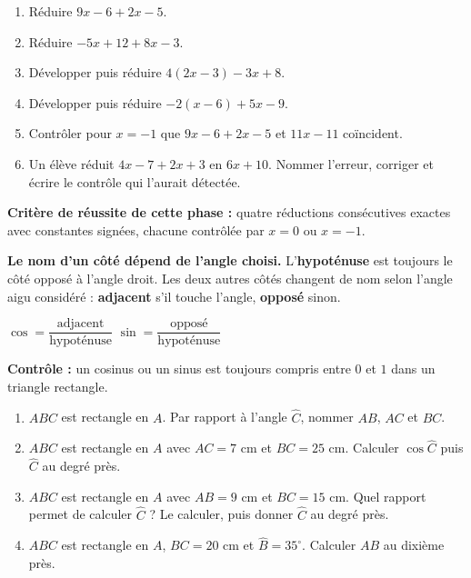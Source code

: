 \documentclass[10pt,a4paper]{article}
\begin{document}
\begin{enumerate}
\needspace{18mm}
\item Réduire $9x - 6 + 2x - 5$.
\needspace{18mm}
\item Réduire $-5x + 12 + 8x - 3$.
\needspace{18mm}
\item Développer puis réduire $4(2x - 3) - 3x + 8$.
\needspace{18mm}
\item Développer puis réduire $-2(x - 6) + 5x - 9$.
\needspace{18mm}
\item Contrôler pour $x = -1$ que $9x - 6 + 2x - 5$ et $11x - 11$ coïncident.
\needspace{18mm}
\item Un élève réduit $4x - 7 + 2x + 3$ en $6x + 10$. Nommer l'erreur, corriger et écrire le contrôle qui l'aurait détectée.
\end{enumerate}
\begin{successbox}\textbf{Critère de réussite de cette phase :} quatre réductions consécutives exactes avec constantes signées, chacune contrôlée par $x = 0$ ou $x = -1$.\end{successbox}
\certline
\needspace{62mm}\par\vspace{3mm}
\begin{methodbox}
\textbf{Le nom d'un côté dépend de l'angle choisi.} L'\textbf{hypoténuse} est toujours le côté opposé à
l'angle droit. Les deux autres côtés changent de nom selon l'angle aigu considéré : \textbf{adjacent}
s'il touche l'angle, \textbf{opposé} sinon.
\par\smallskip
$\cos = \dfrac{\text{adjacent}}{\text{hypoténuse}}$ \qquad $\sin = \dfrac{\text{opposé}}{\text{hypoténuse}}$
\par\smallskip
\textbf{Contrôle :} un cosinus ou un sinus est toujours compris entre $0$ et $1$ dans un triangle rectangle.
\end{methodbox}
\begin{enumerate}
\needspace{18mm}
\item $ABC$ est rectangle en $A$. Par rapport à l'angle $\widehat{C}$, nommer $AB$, $AC$ et $BC$.
\needspace{18mm}
\item $ABC$ est rectangle en $A$ avec $AC = 7$ cm et $BC = 25$ cm. Calculer $\cos\widehat{C}$ puis $\widehat{C}$ au degré près.
\needspace{18mm}
\item $ABC$ est rectangle en $A$ avec $AB = 9$ cm et $BC = 15$ cm. Quel rapport permet de calculer $\widehat{C}$ ? Le calculer, puis donner $\widehat{C}$ au degré près.
\needspace{18mm}
\item $ABC$ est rectangle en $A$, $BC = 20$ cm et $\widehat{B} = 35^\circ$. Calculer $AB$ au dixième près.
\end{enumerate}
\end{document}
